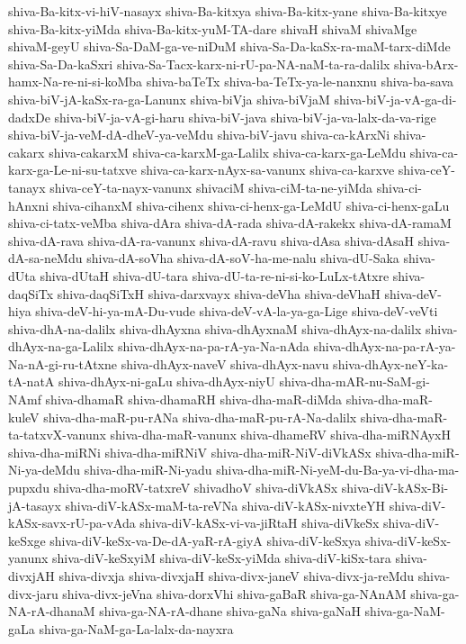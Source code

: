 {shiva-Ba-kitx-vi-hiV-nasayx
shiva-Ba-kitxya
shiva-Ba-kitx-yane
shiva-Ba-kitxye
shiva-Ba-kitx-yiMda
shiva-Ba-kitx-yuM-TA-dare
shivaH
shivaM
shivaMge
shivaM-geyU
shiva-Sa-DaM-ga-ve-niDuM
shiva-Sa-Da-kaSx-ra-maM-tarx-diMde
shiva-Sa-Da-kaSxri
shiva-Sa-Tacx-karx-ni-rU-pa-NA-naM-ta-ra-dalilx
shiva-bArx-hamx-Na-re-ni-si-koMba
shiva-baTeTx
shiva-ba-TeTx-ya-le-nanxnu
shiva-ba-sava
shiva-biV-jA-kaSx-ra-ga-Lanunx
shiva-biVja
shiva-biVjaM
shiva-biV-ja-vA-ga-di-dadxDe
shiva-biV-ja-vA-gi-haru
shiva-biV-java
shiva-biV-ja-va-lalx-da-va-rige
shiva-biV-ja-veM-dA-dheV-ya-veMdu
shiva-biV-javu
shiva-ca-kArxNi
shiva-cakarx
shiva-cakarxM
shiva-ca-karxM-ga-Lalilx
shiva-ca-karx-ga-LeMdu
shiva-ca-karx-ga-Le-ni-su-tatxve
shiva-ca-karx-nAyx-sa-vanunx
shiva-ca-karxve
shiva-ceY-tanayx
shiva-ceY-ta-nayx-vanunx
shivaciM
shiva-ciM-ta-ne-yiMda
shiva-ci-hAnxni
shiva-cihanxM
shiva-cihenx
shiva-ci-henx-ga-LeMdU
shiva-ci-henx-gaLu
shiva-ci-tatx-veMba
shiva-dAra
shiva-dA-rada
shiva-dA-rakekx
shiva-dA-ramaM
shiva-dA-rava
shiva-dA-ra-vanunx
shiva-dA-ravu
shiva-dAsa
shiva-dAsaH
shiva-dA-sa-neMdu
shiva-dA-soVha
shiva-dA-soV-ha-me-nalu
shiva-dU-Saka
shiva-dUta
shiva-dUtaH
shiva-dU-tara
shiva-dU-ta-re-ni-si-ko-LuLx-tAtxre
shiva-daqSiTx
shiva-daqSiTxH
shiva-darxvayx
shiva-deVha
shiva-deVhaH
shiva-deV-hiya
shiva-deV-hi-ya-mA-Du-vude
shiva-deV-vA-la-ya-ga-Lige
shiva-deV-veVti
shiva-dhA-na-dalilx
shiva-dhAyxna
shiva-dhAyxnaM
shiva-dhAyx-na-dalilx
shiva-dhAyx-na-ga-Lalilx
shiva-dhAyx-na-pa-rA-ya-Na-nAda
shiva-dhAyx-na-pa-rA-ya-Na-nA-gi-ru-tAtxne
shiva-dhAyx-naveV
shiva-dhAyx-navu
shiva-dhAyx-neY-ka-tA-natA
shiva-dhAyx-ni-gaLu
shiva-dhAyx-niyU
shiva-dha-mAR-nu-SaM-gi-NAmf
shiva-dhamaR
shiva-dhamaRH
shiva-dha-maR-diMda
shiva-dha-maR-kuleV
shiva-dha-maR-pu-rANa
shiva-dha-maR-pu-rA-Na-dalilx
shiva-dha-maR-ta-tatxvX-vanunx
shiva-dha-maR-vanunx
shiva-dhameRV
shiva-dha-miRNAyxH
shiva-dha-miRNi
shiva-dha-miRNiV
shiva-dha-miR-NiV-diVkASx
shiva-dha-miR-Ni-ya-deMdu
shiva-dha-miR-Ni-yadu
shiva-dha-miR-Ni-yeM-du-Ba-ya-vi-dha-ma-pupxdu
shiva-dha-moRV-tatxreV
shivadhoV
shiva-diVkASx
shiva-diV-kASx-Bi-jA-tasayx
shiva-diV-kASx-maM-ta-reVNa
shiva-diV-kASx-nivxteYH
shiva-diV-kASx-savx-rU-pa-vAda
shiva-diV-kASx-vi-va-jiRtaH
shiva-diVkeSx
shiva-diV-keSxge
shiva-diV-keSx-va-De-dA-yaR-rA-giyA
shiva-diV-keSxya
shiva-diV-keSx-yanunx
shiva-diV-keSxyiM
shiva-diV-keSx-yiMda
shiva-diV-kiSx-tara
shiva-divxjAH
shiva-divxja
shiva-divxjaH
shiva-divx-janeV
shiva-divx-ja-reMdu
shiva-divx-jaru
shiva-divx-jeVna
shiva-dorxVhi
shiva-gaBaR
shiva-ga-NAnAM
shiva-ga-NA-rA-dhanaM
shiva-ga-NA-rA-dhane
shiva-gaNa
shiva-gaNaH
shiva-ga-NaM-gaLa
shiva-ga-NaM-ga-La-lalx-da-nayxra
}
